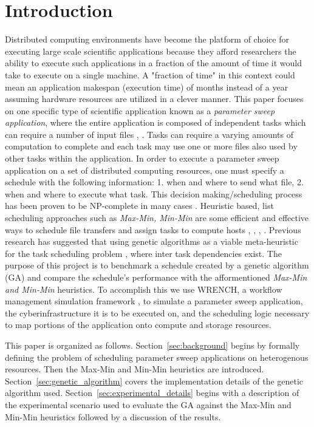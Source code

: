 \section{Introduction}

Distributed computing environments have become the platform of choice for
executing large scale scientific applications because they afford researchers
the ability to execute such applications in a fraction of the amount of time it
would take  to execute on a single machine. A "fraction of time" in this context
could mean an application makespan (execution time) of months instead of a year
assuming hardware resources are utilized in a clever manner.  This paper focuses
on one specific type of scientific application known as a \textit{parameter
sweep application}, where the entire application is composed of independent
tasks which can require a number of input files  \cite{Casanova-param-sweep-00},
\cite{Casanova-apples-param-sweep-00}. Tasks can require a varying amounts of
computation to complete and each task may use one or more files also used by
other tasks within the application. In order to execute a parameter sweep
application on a set of distributed computing resources, one must specify a
schedule with the following information: 1. when and where to send what file, 2.
when and where to execute what task. This decision making/scheduling process has
been proven to be NP-complete in many cases
\cite{Giersch-task-sharing-files-04}. Heuristic based, list scheduling
approaches such as \textit{Max-Min, Min-Min} are some efficient and effective ways
to schedule file transfers and assign tasks to compute hosts
\cite{Casanova-param-sweep-00},
\cite{Casanova-apples-param-sweep-00}, \cite{Giersch-task-sharing-files-04},
\cite{heuristics-99}.
Previous research has suggested that using genetic algorithms as a viable
meta-heuristic for the task scheduling problem \cite{wang-task-matching-97} ,
\cite{wu-incremental-genetic-04} where inter task dependencies exist. The
purpose of this project is to benchmark a schedule created by a genetic
algorithm (GA) and compare the schedule's performance with the afformentioned
\textit{Max-Min and Min-Min} heuristics. To accomplish this we use WRENCH, a
workflow management simulation framework \cite{casanova-works-2018}, to simulate
a parameter sweep application, the cyberinfrastructure it is to be executed on,
and the scheduling logic necessary to map portions of the application onto
compute and storage resources.

This paper is organized as follows. Section~\ref{sec:background} begins by
formally defining the problem of scheduling parameter sweep applications on
heterogenous resources. Then the Max-Min and Min-Min heuristics are introduced.
Section~\ref{sec:genetic_algorithm} covers the implementation details of the
genetic algorithm used. Section~\ref{sec:experimental_details} begins with a
description of the experimental scenario used to evaluate the GA against the
Max-Min and Min-Min heuristics followed by a discussion of the results.
